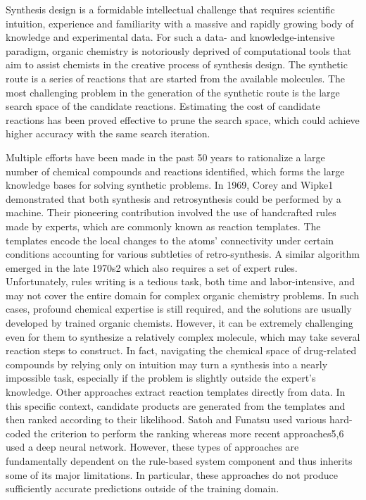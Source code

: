\documentclass[%
 aip,
 jmp,%
 amsmath,amssymb,
 reprint,%
]{revtex4-2}
\begin{document}
Synthesis design is a formidable intellectual challenge that requires scientific intuition, experience and familiarity with
a massive and rapidly growing body of knowledge and experimental data. For such a data- and knowledge-intensive
paradigm, organic chemistry is notoriously deprived of computational tools that aim to assist chemists in the creative
process of synthesis design. The synthetic route is a series of reactions that are started from the available molecules. The
most challenging problem in the generation of the synthetic
route is the large search space of the candidate reactions. 
Estimating the cost of candidate reactions has been proved effective to prune the search space, 
which could achieve higher accuracy with the same search iteration.

Multiple efforts have been made in the past 50 years to
rationalize a large number of chemical compounds and
reactions identified, which forms the large knowledge bases for
solving synthetic problems. In 1969, Corey and Wipke1
demonstrated that both synthesis and retrosynthesis could be
performed by a machine. Their pioneering contribution
involved the use of handcrafted rules made by experts, which
are commonly known as reaction templates. The templates
encode the local changes to the atoms' connectivity under
certain conditions accounting for various subtleties of retro-synthesis. 
A similar algorithm emerged in the late 1970s2 which
also requires a set of expert rules. Unfortunately, rules writing is
a tedious task, both time and labor-intensive, and may not cover
the entire domain for complex organic chemistry problems. In
such cases, profound chemical expertise is still required, and
the solutions are usually developed by trained organic chemists.
However, it can be extremely challenging even for them to 
synthesize a relatively complex molecule, which may take
several reaction steps to construct. In fact, navigating the
chemical space of drug-related compounds by relying only on
intuition may turn a synthesis into a nearly impossible task,
especially if the problem is slightly outside the expert's
knowledge. Other approaches extract reaction templates directly from
data. In this specific context, candidate products are generated 
from the templates and then ranked according to their
likelihood. Satoh and Funatsu used various hard-coded
the criterion to perform the ranking whereas more recent
approaches5,6 used a deep neural network. However, these types
of approaches are fundamentally dependent on the rule-based
system component and thus inherits some of its major limitations. 
In particular, these approaches do not produce sufficiently accurate 
predictions outside of the training domain.
\end{document}
